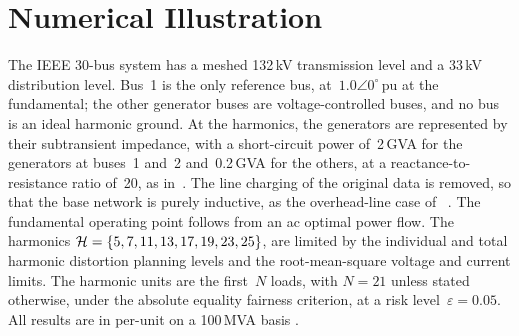 \section{Numerical Illustration}
\label{sec:numerical_illustration}


The IEEE 30-bus system has a meshed 132\,kV transmission level and a 33\,kV distribution level. Bus~1 is the only reference bus, at~$1.0\angle0^{\circ}$\,pu at the fundamental; the other generator buses are voltage-controlled buses, and no bus is an ideal harmonic ground. At the harmonics, the generators are represented by their subtransient impedance, with a short-circuit power of~2\,GVA for the generators at buses~1 and~2 and~0.2\,GVA for the others, at a reactance-to-resistance ratio of~20, as in~\cite{vanacker_impact_2025}. The line charging of the original data is removed, so that the base network is purely inductive, as the overhead-line case of~\cite{vanacker_impact_2025}%
. %
 The fundamental operating point follows from an ac optimal power flow. The harmonics $\mathcal{H} = \{5,7,11,13,17,19,23,25\}$, %
 are limited by the individual and total harmonic distortion planning levels and the root-mean-square voltage and current limits. The harmonic units are the first~$N$ loads, with $N = 21$ unless stated otherwise, under the absolute equality fairness criterion, at a risk level~$\varepsilon = 0.05$. All results are in per-unit on a 100\,MVA basis%
.

